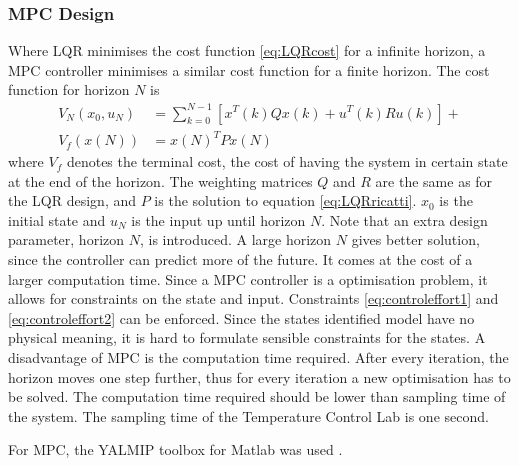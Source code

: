 \subsubsection{MPC Design}
Where LQR minimises the cost function \ref{eq:LQRcost} for a infinite horizon, a MPC controller minimises a similar cost function for a finite horizon. The cost function for horizon $N$ is
\begin{align}
    V_N(x_0,u_N) &= \sum_{k=0}^{N-1}[x^T(k)Qx(k) + u^T(k)Ru(k)] +  \label{eq:MPCcost}\\
    V_f(x(N)) &= x(N)^TPx(N) \nonumber
\end{align}
where $V_f$ denotes the terminal cost, the cost of having the system in certain state at the end of the horizon. The weighting matrices $Q$ and $R$ are the same as for the LQR design, and $P$ is the solution to equation \ref{eq:LQRricatti}. $x_0$ is the initial state and $u_N$ is the input up until horizon $N$. Note that an extra design parameter, horizon $N$, is introduced. A large horizon $N$ gives better solution, since the controller can predict more of the future. It comes at the cost of a larger computation time.
Since a MPC controller is a optimisation problem, it allows for constraints on the state and input. Constraints \ref{eq:controleffort1} and \ref{eq:controleffort2} can be enforced. Since the states identified model have no physical meaning, it is hard to formulate sensible constraints for the states.
A disadvantage of MPC is the computation time required. After every iteration, the horizon moves one step further, thus for every iteration a new optimisation has to be solved. The computation time required should be lower than sampling time of the system. The sampling time of the Temperature Control Lab is one second.

For MPC, the YALMIP toolbox for Matlab was used \cite{Lofberg2004}.